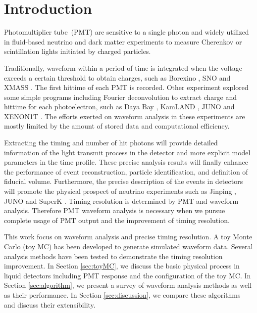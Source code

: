 \section{Introduction} %
\label{sec:introduction}

Photomultiplier tube~(PMT) are sensitive to a single photon and widely utilized in fluid-based neutrino and dark matter experiments to measure Cherenkov or scintillation lights initiated by charged particles.

Traditionally, waveform within a period of time is integrated when the voltage exceeds a certain threshold to obtain charges, such as Borexino \cite{lagomarsino_gateless_1999}, SNO \cite{dunger_event_2019} and XMASS \cite{abe_xmass_2013}. The first hittime of each PMT is recorded. Other experiment explored some simple programs including Fourier deconvolution to extract charge and hittime for each photoelectron, such as Daya Bay \cite{huang_flash_2018}, KamLAND \cite{the_kamland_collaboration_production_2010}, JUNO \cite{zhang_comparison_2019} and XENON1T \cite{aprile_xenon1t_2019}. The efforts exerted on waveform analysis in these experiments are mostly limited by the amount of stored data and computational efficiency. 

Extracting the timing and number of hit photons will provide detailed information of the light transmit process in the detector and more explicit model parameters in the time profile. These precise analysis results will finally enhance the performance of event reconstruction, particle identification, and definition of fiducial volume. Furthermore, the precise description of the events in detectors will promote the physical prospect of neutrino experiments such as Jinping \cite{beacom_physics_2017}, JUNO \cite{an_neutrino_2016} and SuperK \cite{noauthor_super-kamiokande_2003}. Timing resolution is determined by PMT and waveform analysis. Therefore PMT waveform analysis is necessary when we pursue complete usage of PMT output and the improvement of timing resolution. 

This work focus on waveform analysis and precise timing resolution. A toy Monte Carlo (toy MC) has been developed to generate simulated waveform data. Several analysis methods have been tested to demonstrate the timing resolution improvement. In Section \ref{sec:toyMC}, we discuss the basic physical process in liquid detectors including PMT response and the configuration of the toy MC. In Section \ref{sec:algorithm}, we present a survey of waveform analysis methods as well as their performance. In Section \ref{sec:discussion}, we compare these algorithms and discuss their extensibility. 

